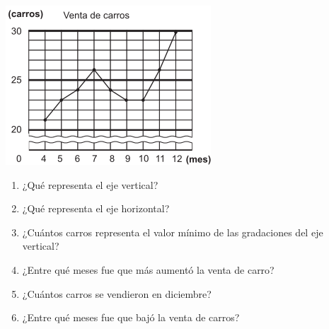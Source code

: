 \documentclass[10pt,twoside]{article}
\begin{document}
\begin{enumerate}
\begin{minipage}{.4\textwidth}
\includegraphics[scale=.6]{Images/grafica07.png} 
\end{minipage}
\begin{minipage}{.55\textwidth}
\begin{enumerate}
\item ¿Qu\'{e} representa el eje vertical?
\item ¿Qu\'{e} representa el eje horizontal?
\item ¿Cu\'{a}ntos carros representa el valor m\'{i}nimo de las gradaciones del eje vertical?
\item ¿Entre qu\'{e} meses fue que m\'{a}s aument\'{o} la venta de carro?
\item ¿Cu\'{a}ntos carros se vendieron en diciembre?
\item ¿Entre qu\'{e} meses fue que baj\'{o} la venta de carros?
\end{enumerate}
\end{minipage}
\end{enumerate}
\end{document}
